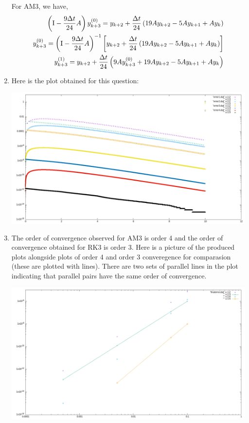 \documentclass{article}
\begin{document}
\begin{enumerate}[label=\alph*)]
        For AM3, we have, 
        \begin{align}
            \left(\mathrm{I} - \frac{9\Delta t}{24}A\right)y_{k+3}^{(0)} = y_{k+2} + \frac{\Delta t}{24}\left(19Ay_{k+2} - 5Ay_{k+1} + Ay_{k}\right) \\
            y_{k+3}^{(0)} = \left(\mathrm{I} - \frac{9\Delta t}{24}A\right)^{-1}\left[y_{k+2} + \frac{\Delta t}{24}\left(19Ay_{k+2} - 5Ay_{k+1} + Ay_{k}\right)\right] \\
            y_{k+3}^{(1)} = y_{k+2} + \frac{\Delta t}{24}\left(9Ay_{k+3}^{(0)} + 19Ay_{k+2} - 5Ay_{k+1} + Ay_{k}\right)
        \end{align}

        \item Here is the plot obtained for this question: 
        \begin{center}
            \includegraphics[width=.8\textwidth]{../fortran/error_v_t.png}
        \end{center}

        \item  The order of convergence observed for AM3 is order 4 and the order of convergence obtained for RK3 is order 3. Here is a picture of the produced plots alongside plots of order 4 and order 3 converegence for comparasion (these are plotted with lines). There are two sets of parallel lines in the plot indicating that parallel pairs have the same order of convergence. 
        \begin{center}
            \includegraphics[width=.8\textwidth]{../fortran/final_error.png}
        \end{center}
       
       

\end{enumerate}
\end{document}
